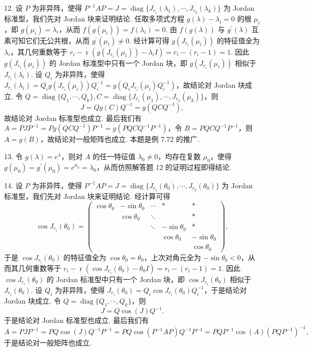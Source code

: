 \documentclass[UTF8, 12pt, fontset=fandol, oneside]{ctexart}
\begin{document}
12. 设 $P$ 为非异阵，使得 $P^{-1}AP=J=\operatorname{diag}\{J_{r_1}(\lambda_1),\cdots,J_{r_k}(\lambda_k)\}$ 为 Jordan 标准型，我们先对 Jordan 块来证明结论. 任取多项式方程 $g(\lambda)-\lambda_i=0$ 的根 $\mu_i$，即 $g(\mu_i)=\lambda_i$，从而 $f(g(\mu_i))=f(\lambda_i)=0$. 由 $f(g(\lambda))$ 与 $g^{\prime}(\lambda)$ 互素可知它们无公共根，从而 $g^{\prime}(\mu_i)\ne0$. 经计算可得 $g(J_{r_i}(\mu_i))$ 的特征值全为 $\lambda_i$，其几何重数等于 $r_i-\operatorname{r}(g(J_{r_i}(\mu_i))-\lambda_iI)=r_i-(r_i-1)=1$. 因此 $g(J_{r_i}(\mu_i))$ 的 Jordan 标准型中只有一个 Jordan 块，即 $g(J_{r_i}(\mu_i))$ 相似于 $J_{r_i}(\lambda_i)$. 设 $Q_i$ 为非异阵，使得 $J_{r_i}(\lambda_i)=Q_ig(J_{r_i}(\mu_i))Q_i^{-1}=g(Q_iJ_{r_i}(\mu_i)Q_i^{-1})$，故结论对 Jordan 块成立. 令 $Q=\operatorname{diag}\{Q_1,\cdots,Q_k\},C=\operatorname{diag}\{J_{r_1}(\mu_1),\cdots,J_{r_k}(\mu_k)\}$，则
\[
J=Qg(C)Q^{-1}=g(QCQ^{-1}),
\]
故结论对 Jordan 标准型也成立. 最后我们有 $A=PJP^{-1}=Pg(QCQ^{-1})P^{-1}=g(PQCQ^{-1}P^{-1})$，令 $B=PQCQ^{-1}P^{-1}$，则 $A=g(B)$，故结论对一般矩阵也成立. 本题是例 7.72 的推广.

13. 令 $g(\lambda)=e^{\lambda}$，则对 $A$ 的任一特征值 $\lambda_0\ne0$，均存在复数 $\mu_0$，使得 $g(\mu_0)=g^{\prime}(\mu_0)=e^{\mu_0}=\lambda_0$，从而仿照解答题 12 的证明过程即得结论.

14. 设 $P$ 为非异阵，使得 $P^{-1}AP=J=\operatorname{diag}\{J_{r_1}(\theta_0),\cdots,J_{r_k}(\theta_0)\}$ 为 Jordan 标准型，我们先对 Jordan 块来证明结论. 经计算可得
\[
\cos J_{r_i}(\theta_0)=\left(\begin{array}{ccccc}
\cos\theta_0&-\sin\theta_0&\cdots&*&*\\
&\cos\theta_0&\ddots&&*\\
&&\ddots&-\sin\theta_0&*\\
&&&\cos\theta_0&-\sin\theta_0\\
&&&&\cos\theta_0
\end{array}\right),
\]
于是 $\cos J_{r_i}(\theta_0)$ 的特征值全为 $\cos\theta_0=\theta_0$，上次对角元全为 $-\sin\theta_0<0$，从而其几何重数等于 $r_i-\operatorname{r}(\cos J_{r_i}(\theta_0)-\theta_0I)=r_i-(r_i-1)=1$. 因此 $\cos J_{r_i}(\theta_0)$ 的 Jordan 标准型中只有一个 Jordan 块，即 $\cos J_{r_i}(\theta_0)$ 相似于 $J_{r_i}(\theta_0)$. 设 $Q_i$ 为非异阵，使得 $J_{r_i}(\theta_0)=Q_i\cos J_{r_i}(\theta_0)Q_i^{-1}$，于是结论对 Jordan 块成立. 令 $Q=\operatorname{diag}\{Q_1,\cdots,Q_k\}$，则
\[
J=Q\cos(J)Q^{-1}.
\]
于是结论对 Jordan 标准型也成立. 最后我们有
\[
A=PJP^{-1}=PQ\cos(J)Q^{-1}P^{-1}=PQ\cos(P^{-1}AP)Q^{-1}P^{-1}=PQP^{-1}\cos(A)(PQP^{-1})^{-1},
\]
于是结论对一般矩阵也成立.
\end{document}
